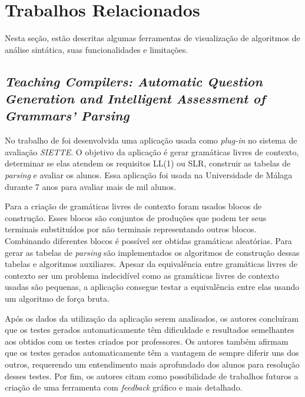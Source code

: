 \chapter{Trabalhos Relacionados}
\label{cap:trabalhos-relacionados}

Nesta seção, estão descritas algumas ferramentas de visualização de algoritmos de análise sintática, suas funcionalidades e limitações.

\section{\textit{Teaching Compilers: Automatic Question Generation and Intelligent Assessment of Grammars' Parsing}}
No trabalho de \textcite{munozquestions} foi desenvolvida uma aplicação usada como \textit{plug-in} no sistema de avaliação \textit{SIETTE}. O objetivo da aplicação é gerar gramáticas livres de contexto, determinar se elas atendem os requisitos LL(1) ou SLR, construir as tabelas de \textit{parsing} e avaliar os alunos. Essa aplicação foi usada na Universidade de Málaga durante 7 anos para avaliar mais de mil alunos.

Para a criação de gramáticas livres de contexto foram usados blocos de construção. Esses blocos são conjuntos de produções que podem ter seus terminais substituídos por não terminais representando outros blocos. Combinando diferentes blocos é possível ser obtidas gramáticas aleatórias. Para gerar as tabelas de \textit{parsing} são implementados os algoritmos de construção dessas tabelas e algoritmos auxiliares. Apesar da equivalência entre gramáticas livres de contexto ser um problema indecidível como as gramáticas livres de contexto usadas são pequenas, a aplicação consegue testar a equivalência entre elas usando um algoritmo de força bruta.

Após os dados da utilização da aplicação serem analisados, os autores concluíram que os testes gerados automaticamente têm dificuldade e resultados semelhantes aos obtidos com os testes criados por professores. Os autores também afirmam que os testes gerados automaticamente têm a vantagem de sempre diferir uns dos outros, requerendo um entendimento mais aprofundado dos alunos para resolução desses testes. Por fim, os autores citam como possibilidade de trabalhos futuros a criação de uma ferramenta com \textit{feedback} gráfico e mais detalhado.


